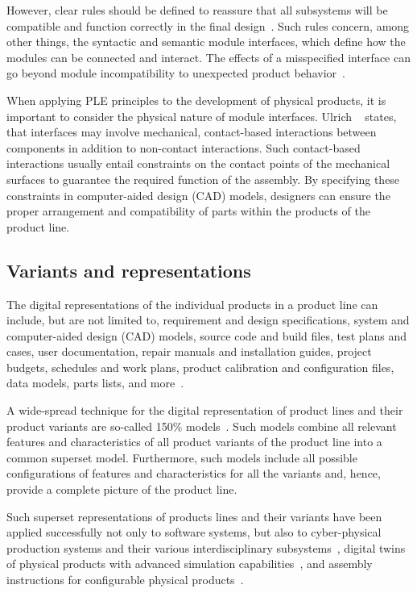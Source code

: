 \documentclass[sigconf,review]{acmart}
\begin{document}
However, clear rules should be defined to reassure that all subsystems will be compatible and function correctly in the final design~\cite{Baldwin_2003}.
Such rules concern, among other things, the syntactic and semantic module interfaces, which define how the modules can be connected and interact.
The effects of a misspecified interface can go beyond module incompatibility to unexpected product behavior~\cite{Parslov_2015}. 

When applying PLE principles to the development of physical products, it is important to consider the physical nature of module interfaces.
Ulrich ~\cite{Ulrich_1995} states, that interfaces may involve mechanical, contact-based interactions between components in addition to non-contact interactions.
Such contact-based interactions usually entail constraints on the contact points of the mechanical surfaces to guarantee the required function of the assembly.
By specifying these constraints in computer-aided design (CAD) models, designers can ensure the proper arrangement and compatibility of parts within the products of the product line.

\subsection{Variants and representations}
\label{sec:variants}

The digital representations of the individual products in a product line can include, but are not limited to, requirement and design specifications, system and computer-aided design (CAD) models, source code and build files, test plans and cases, user documentation, repair manuals and installation guides, project budgets, schedules and work plans, product calibration and configuration files, data models, parts lists, and more~\cite{Clements_2015}. 

A wide-spread technique for the digital representation of product lines and their product variants are so-called 150\% models~\cite{Clements_2015}.
Such models combine all relevant features and characteristics of all product variants of the product line into a common superset model.
Furthermore, such models include all possible configurations of features and characteristics for all the variants and, hence, provide a complete picture of the product line.

Such superset representations of products lines and their variants have been applied successfully not only to software systems, but also to cyber-physical production systems and their various interdisciplinary subsystems~\cite{Fadhlillah_2023}, digital twins of physical products with advanced simulation capabilities~\cite{Wagner_2024}, and assembly instructions for configurable physical products~\cite{Zogopoulos_2024}.
\end{document}
